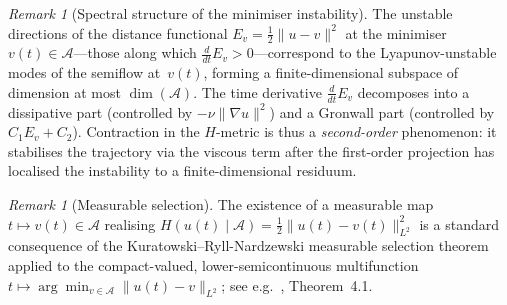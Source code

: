 \documentclass[12pt,a4paper]{article}
\theoremstyle{definition}
\theoremstyle{plain}
\theoremstyle{remark}
\newtheorem{remark}[definition]{Remark}
\begin{document}
\begin{remark}[Spectral structure of the minimiser instability]
\label{rem:resolvent-minimiser}
The unstable directions of the distance functional $E_v = \frac{1}{2}\|u-v\|^2$
at the minimiser $v(t) \in \mathcal{A}$---those along which
$\frac{d}{dt}E_v > 0$---correspond to the Lyapunov-unstable modes of the
semiflow at~$v(t)$, forming a finite-dimensional subspace of dimension
at most $\dim(\mathcal{A})$.  The time derivative $\frac{d}{dt}E_v$
decomposes into a dissipative part (controlled by $-\nu\|\nabla u\|^2$)
and a Gronwall part (controlled by $C_1 E_v + C_2$).  Contraction in the
$H$-metric is thus a \emph{second-order} phenomenon: it stabilises the
trajectory via the viscous term after the first-order projection has
localised the instability to a finite-dimensional residuum.
\end{remark}

\begin{remark}[Measurable selection]
\label{rem:selection}
The existence of a measurable map $t\mapsto v(t)\in\mathcal{A}$ realising
$H(u(t)\mid\mathcal{A}) = \tfrac12\|u(t)-v(t)\|_{L^2}^2$ is a standard
consequence of the Kuratowski--Ryll-Nardzewski measurable selection theorem applied
to the compact-valued, lower-semicontinuous multifunction
$t\mapsto \arg\min_{v\in\mathcal{A}}\|u(t)-v\|_{L^2}$; see e.g.\ \cite{Wagner1977}, Theorem~4.1.
\end{remark}
\end{document}
